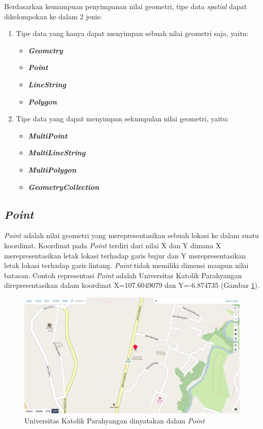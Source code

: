 	Berdasarkan kemampuan penyimpanan nilai geometri, tipe data \textit{spatial} dapat dikelompokan ke dalam 2 jenis:
\begin{enumerate}
	\item Tipe data yang hanya dapat menyimpan sebuah nilai geometri saja, yaitu:
	\begin{itemize}
		\item \textbf{\textit{Geometry}}
		\item \textbf{\textit{Point}}
		\item \textbf{\textit{LineString}}
		\item \textbf{\textit{Polygon}}
	\end{itemize}
	\item Tipe data yang dapat menyimpan sekumpulan nilai geometri, yaitu:
	\begin{itemize}
		\item \textbf{\textit{MultiPoint}}
		\item \textbf{\textit{MultiLineString}}
		\item \textbf{\textit{MultiPolygon}}
		\item \textbf{\textit{GeometryCollection}}
	\end{itemize}
\end{enumerate}

\subsection{\textit{Point}}
\label{sec:point}
\textit{Point} adalah nilai geometri yang merepresentasikan sebuah lokasi ke dalam suatu koordinat\cite{mysqlspatial}. Koordinat pada \textit{Point} terdiri dari nilai X dan Y dimana X merepresentasikan letak lokasi terhadap garis bujur dan Y merepresentasikan letak lokasi terhadap garis lintang. \textit{Point} tidak memiliki dimensi maupun nilai batasan. Contoh representasi \textit{Point} adalah Universitas Katolik Parahyangan direpresentasikan dalam koordinat X=107.6049079 dan Y=-6.874735 (Gambar \ref{fig:2_UNPAR}).

\begin{figure}[htbp]
	\centering
		\includegraphics[scale=0.35]{Gambar/2_point.png}
	\caption{Universitas Katolik Parahyangan dinyatakan dalam \textit{Point}\cite{geojson}}
	\label{fig:2_UNPAR}
\end{figure}

